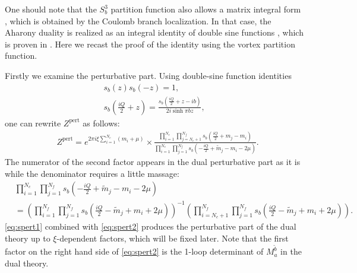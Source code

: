 \documentclass[a4paper,11pt]{article}
\begin{document}
One should note that the $S^3_b$ partition function also allows a matrix integral form \cite{Hama:2011ea}, which is obtained by the Coulomb branch localization. In that case, the Aharony duality is realized as an integral identity of double sine functions \cite{Willett:2011gp}, which is proven in \cite{Bult:2007}. Here we recast the proof of the identity using the vortex partition function.


Firstly we examine the perturbative part. Using double-sine function identities
\begin{gather}
s_b(z) s_b(-z) = 1, \\
s_b \left(\frac{i Q}{2}+z\right) = \frac{s_b \left(\frac{i Q}{2}+z-i b\right)}{2 i \sinh \pi b z},
\end{gather}
one can rewrite $Z^\text{pert}$ as follows:
\begin{align}
\label{eq:spert1}
& Z^\text{pert} = e^{2 \pi i \xi \sum_{i = 1}^{N_c} (m_i+\mu)} \times \frac{\prod_{i = 1}^{N_c} \prod_{j = N_c+1}^{N_f} s_b(\frac{i Q}{2}+m_j-m_i)}{\prod_{i = 1}^{N_c} \prod_{j = 1}^{N_f} s_b(-\frac{i Q}{2}+\tilde m_j-m_i-2 \mu)}.
\end{align}
The numerator of the second factor appears in the dual perturbative part as it is while the denominator requires a little massage:
\begin{align}
\label{eq:spert2}
& \prod_{i = 1}^{N_c} \prod_{j = 1}^{N_f} s_b \left(-\frac{i Q}{2}+\tilde m_j-m_i-2 \mu\right) \nonumber \\
&= \left(\prod_{i = 1}^{N_f} \prod_{j = 1}^{N_f} s_b \left(\frac{i Q}{2}-\tilde m_j+m_i+2 \mu\right)\right)^{-1} \left(\prod_{i = N_c+1}^{N_f} \prod_{j = 1}^{N_f} s_b \left(\frac{i Q}{2}-\tilde m_j+m_i+2 \mu\right)\right).
\end{align}
\eqref{eq:spert1} combined with \eqref{eq:spert2} produces the perturbative part of the dual theory up to $\xi$-dependent factors, which will be fixed later. Note that the first factor on the right hand side of \eqref{eq:spert2} is the 1-loop determinant of $M_a^{\tilde b}$ in the dual theory.
\end{document}
